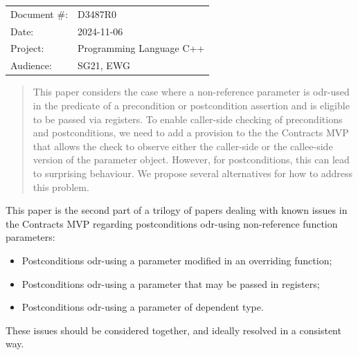 \begin{tabular}{ll}
Document \#: & D3487R0 \\
Date: &2024-11-06 \\
Project: & Programming Language C++ \\
Audience: & SG21, EWG
\end{tabular}

\begin{abstract}
This paper considers the case where a non-reference parameter is odr-used in the predicate of a precondition or postcondition assertion and is eligible to be passed via registers. To enable caller-side checking of preconditions and postconditions, we need to add a provision to the the Contracts MVP \cite{P2900R10} that allows the check to observe either the caller-side or the callee-side version of the parameter object. However, for postconditions, this can lead to surprising behaviour. We propose several alternatives for how to address this problem.
\end{abstract}







This paper is the second part of a trilogy of papers dealing with known issues in the Contracts MVP \cite{P2900R10} regarding postconditions odr-using non-reference function parameters:
\begin{itemize}
\item \cite{D3484R1} Postconditions odr-using a parameter modified in an overriding function;
\item \cite{D3487R0} Postconditions odr-using a parameter that may be passed in registers;
\item \cite{D3489R0} Postconditions odr-using a parameter of dependent type.
\end{itemize}
These issues should be considered together, and ideally resolved in a consistent way.

